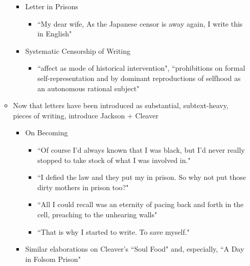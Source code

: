 \documentclass[14pt, letterpaper]{report}
\begin{document}
\begin{enumerate}
\begin{itemize}
\begin{itemize}
\begin{itemize}
				\end{itemize}

				\item Letter in Prisons
				\begin{itemize}
		
					\item ``My dear wife, As the Japanese censor is away again, I write this in 
						English"\autocite[121]{life-of-paper}
					
				\end{itemize}
				
				\item Systematic Censorship of Writing
				\begin{itemize}

					\item ``affect as mode of historical intervention", 
					``prohibitions on formal self-representation and by 
					dominant reproductions of selfhood as an autonomous 
					rational subject"\autocite[121]{life-of-paper}

				
				\end{itemize}
				
			\end{itemize}

			\item   Now that letters have been introduced as substantial, subtext-heavy, 
			        pieces of writing, introduce Jackson + Cleaver
				\begin{itemize}
				
					\item On Becoming
					\begin{itemize}
						\item ``Of course I'd always known that I was black, but I'd
							never really stopped to take stock of what I was involved 
							in."\autocite[3]{soul-on-ice}
						\item ``I defied the law and they put my in prison. So why not put
							those dirty mothers in prison too?"\autocite[4]{soul-on-ice}
						\item ``All I could recall was an eternity of pacing back and forth in
							the cell, preaching to the unhearing walls"\autocite[11]{soul-on-ice}
						\item ``That is why I started to write. To save myself."\autocite[15]{soul-on-ice}
					\end{itemize}
					
					\item Similar elaborations on Cleaver's ``Soul Food" and, especially, ``A Day in Folsom Prison"


\end{itemize}
\end{itemize}
\end{enumerate}
\end{document}
